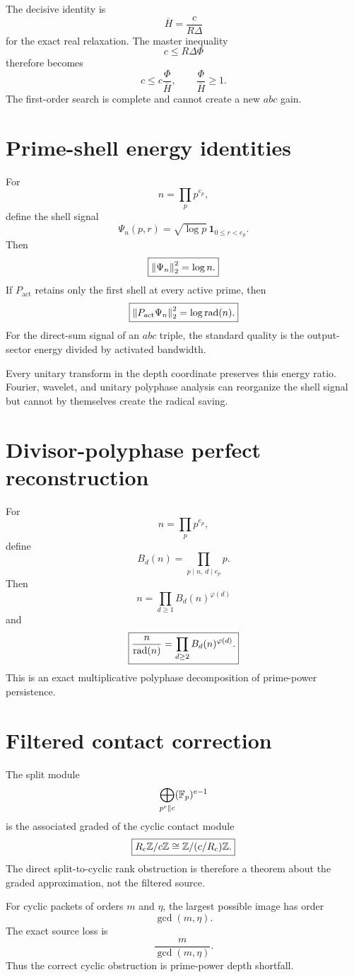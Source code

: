 The decisive identity is
\[
\boxed{
\overline H
=
\frac{c}{R\Delta}
}
\]
for the exact real relaxation. The master inequality
\[
c\le R\Delta\Phi
\]
therefore becomes
\[
\boxed{
c
\le
c\frac{\Phi}{\overline H},
\qquad
\frac{\Phi}{\overline H}\ge1.
}
\]
The first-order search is complete and cannot create a new $abc$ gain.

\section{Prime-shell energy identities}
For
\[
n=\prod_pp^{e_p},
\]
define the shell signal
\[
\Psi_n(p,r)=\sqrt{\log p}\,\mathbf 1_{0\le r<e_p}.
\]
Then
\[
\boxed{
\left\lVert\Psi_n\right\rVert_2^2=\log n.
}
\]
If $P_{\mathrm{act}}$ retains only the first shell at every active prime, then
\[
\boxed{
\left\lVert P_{\mathrm{act}}\Psi_n\right\rVert_2^2
=
\log\operatorname{rad}(n).
}
\]
For the direct-sum signal of an $abc$ triple, the standard quality is the output-sector energy divided by activated bandwidth.

Every unitary transform in the depth coordinate preserves this energy ratio. Fourier, wavelet, and unitary polyphase analysis can reorganize the shell signal but cannot by themselves create the radical saving.

\section{Divisor-polyphase perfect reconstruction}
For
\[
n=\prod_pp^{e_p},
\]
define
\[
B_d(n)=\prod_{p\mid n,\ d\mid e_p}p.
\]
Then
\[
\boxed{
n=\prod_{d\ge1}B_d(n)^{\varphi(d)}
}
\]
and
\[
\boxed{
\frac{n}{\operatorname{rad}(n)}
=
\prod_{d\ge2}B_d(n)^{\varphi(d)}.
}
\]
This is an exact multiplicative polyphase decomposition of prime-power persistence.

\section{Filtered contact correction}
The split module
\[
\bigoplus_{p^e\parallel c}(\mathbb F_p)^{e-1}
\]
is the associated graded of the cyclic contact module
\[
\boxed{
R_c\mathbb Z/c\mathbb Z
\cong
\mathbb Z/(c/R_c)\mathbb Z.
}
\]
The direct split-to-cyclic rank obstruction is therefore a theorem about the graded approximation, not the filtered source.

For cyclic packets of orders $m$ and $\eta$, the largest possible image has order
\[
\gcd(m,\eta).
\]
The exact source loss is
\[
\boxed{
\frac{m}{\gcd(m,\eta)}.
}
\]
Thus the correct cyclic obstruction is prime-power depth shortfall.

